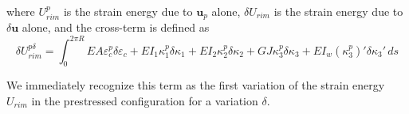 \documentclass[\rootdir/thesis.tex]{subfiles}
\begin{document}
where $U_{rim}^p$ is the strain energy due to $\mathbf{u}_p$ alone, $\delta U_{rim}$ is the strain energy due to $\delta\mathbf{u}$ alone, and the cross-term is defined as
\begin{equation}
\label{eq:U_rim_pd}
\delta U_{rim}^{p\delta} = \int_0^{2\pi R}
	EA\varepsilon_c^p \delta\varepsilon_c +
	EI_1\kappa_1^p\delta\kappa_1 +
	EI_2\kappa_2^p\delta\kappa_2 +
	GJ\kappa_3^p\delta\kappa_3 +
	EI_w(\kappa_3^p)'\delta\kappa_3'\, ds
\end{equation}

We immediately recognize this term as the first variation of the strain energy $U_{rim}$ in the prestressed configuration for a variation $\delta$.




\end{document}
